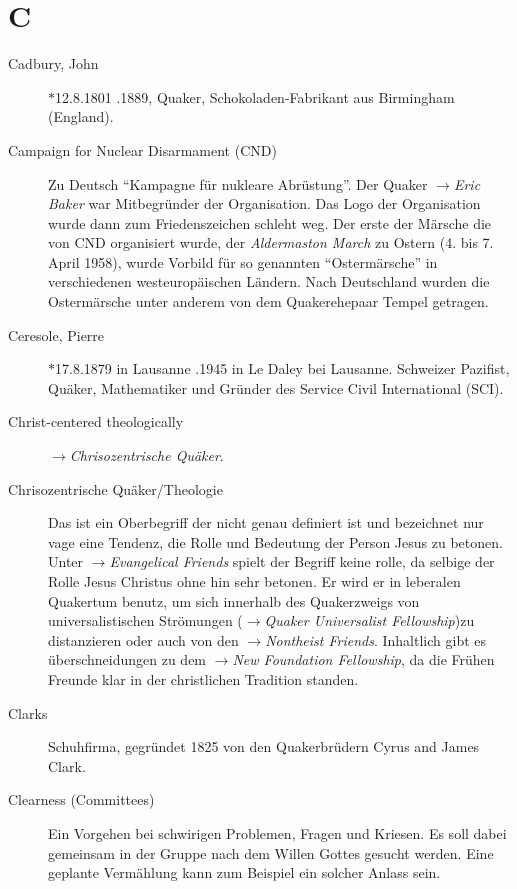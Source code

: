 \section*{C}

\articlesize

\begin{description}

 \item[Cadbury, John] $\ast$12.8.1801 .1889, Quaker,
Schokoladen-Fabrikant aus Birmingham (England).

 \item[Campaign for Nuclear Disarmament (CND)] Zu Deutsch ``Kampagne für
nukleare Abrüstung''. Der Quaker $\to$\textit{Eric Baker} war Mitbegründer der
Organisation. Das Logo der Organisation wurde dann zum Friedenszeichen schleht
weg. Der erste der Märsche die von CND organisiert wurde, der
\textit{Aldermaston March} zu Ostern (4. bis 7. April 1958), wurde Vorbild für
so genannten ``Ostermärsche'' in verschiedenen westeuropäischen Ländern. Nach
Deutschland wurden die Ostermärsche unter anderem von dem Quakerehepaar Tempel
getragen.

 \item[Ceresole, Pierre] $\ast$17.8.1879 in Lausanne .1945 in Le Daley
bei Lausanne. Schweizer Pazifist, Quäker, Mathematiker und Gründer des Service
Civil International (SCI).

 \item[Christ-centered theologically] $\to$\textit{Chrisozentrische Quäker}.

 \item[Chrisozentrische Quäker/Theologie] Das ist ein Oberbegriff der nicht genau
definiert ist und bezeichnet nur vage eine Tendenz, die Rolle und Bedeutung der
Person Jesus zu betonen. Unter $\to$\textit{Evangelical Friends} spielt der
Begriff keine rolle, da selbige der Rolle Jesus Christus ohne hin sehr betonen.
Er wird er in leberalen Quakertum benutz, um sich innerhalb des Quakerzweigs von
universalistischen Strömungen ($\to$\textit{Quaker Universalist Fellowship})zu
distanzieren oder auch von den $\to$\textit{Nontheist Friends}. Inhaltlich gibt
es überschneidungen zu dem $\to$\textit{New Foundation Fellowship}, da die
Frühen Freunde klar in der christlichen Tradition standen.

 \item[Clarks] Schuhfirma, gegründet 1825 von den Quakerbrüdern Cyrus and James
Clark.
 
 \item[Clearness (Committees)] Ein Vorgehen bei schwirigen Problemen, Fragen und
Kriesen. Es soll dabei gemeinsam in der Gruppe nach dem Willen Gottes gesucht
werden. Eine geplante Vermählung kann zum Beispiel ein solcher Anlass sein.


\end{description}
